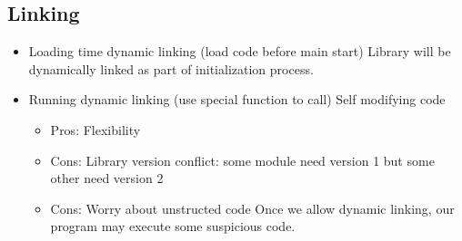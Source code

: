 \documentclass[11pt]{article}
\begin{document}
\subsection{Linking}
\label{sec:org30332c0}

\begin{itemize}
\item Loading time dynamic linking (load code before main start)
Library will be dynamically linked as part of initialization process.

\item Running dynamic linking (use special function to call)
Self modifying code
\begin{itemize}
\item Pros: Flexibility
\item Cons: Library version conflict: some module need version 1 but some other need version 2
\item Cons: Worry about unstructed code
Once we allow dynamic linking, our program may execute some suspicious code.
\end{itemize}
\end{itemize}
\end{document}

